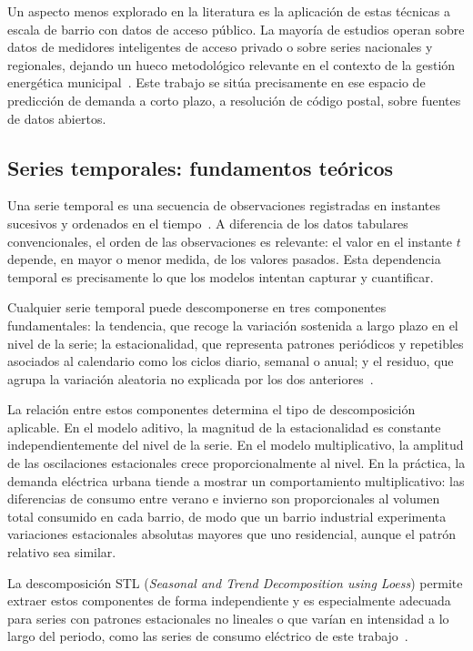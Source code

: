 \documentclass[12pt, a4paper]{article}
\begin{document}
Un aspecto menos explorado en la literatura es la aplicación de estas técnicas a escala de barrio con datos de acceso público. La mayoría de estudios operan sobre datos de medidores inteligentes de acceso privado o sobre series nacionales y regionales, dejando un hueco metodológico relevante en el contexto de la gestión energética municipal~\cite{jiang2024}. Este trabajo se sitúa precisamente en ese espacio de predicción de demanda a corto plazo, a resolución de código postal, sobre fuentes de datos abiertos.

\subsection{Series temporales: fundamentos teóricos}

Una serie temporal es una secuencia de observaciones registradas en instantes sucesivos y ordenados en el tiempo~\cite{hyndman2021}. A diferencia de los datos tabulares convencionales, el orden de las observaciones es relevante: el valor en el instante $t$ depende, en mayor o menor medida, de los valores pasados. Esta dependencia temporal es precisamente lo que los modelos intentan capturar y cuantificar.

Cualquier serie temporal puede descomponerse en tres componentes fundamentales: la tendencia, que recoge la variación sostenida a largo plazo en el nivel de la serie; la estacionalidad, que representa patrones periódicos y repetibles asociados al calendario como los ciclos diario, semanal o anual; y el residuo, que agrupa la variación aleatoria no explicada por los dos anteriores~\cite{hyndman2021}.

La relación entre estos componentes determina el tipo de descomposición aplicable. En el modelo aditivo, la magnitud de la estacionalidad es constante independientemente del nivel de la serie. En el modelo multiplicativo, la amplitud de las oscilaciones estacionales crece proporcionalmente al nivel. En la práctica, la demanda eléctrica urbana tiende a mostrar un comportamiento multiplicativo: las diferencias de consumo entre verano e invierno son proporcionales al volumen total consumido en cada barrio, de modo que un barrio industrial experimenta variaciones estacionales absolutas mayores que uno residencial, aunque el patrón relativo sea similar.

La descomposición STL (\textit{Seasonal and Trend Decomposition using Loess}) permite extraer estos componentes de forma independiente y es especialmente adecuada para series con patrones estacionales no lineales o que varían en intensidad a lo largo del periodo, como las series de consumo eléctrico de este trabajo~\cite{hyndman2021}.
\end{document}
